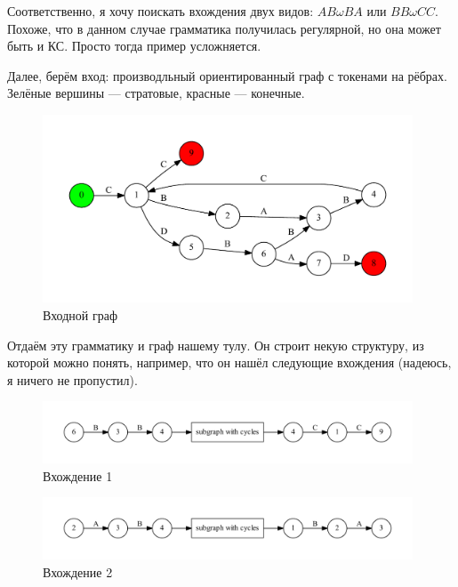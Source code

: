 \documentclass[a5paper]{article}
\begin{document}
Соответственно, я хочу поискать вхождения двух видов:  $AB\omega BA$ или $BB\omega CC$. Похоже, что в данном случае грамматика получилась регулярной, но она может быть и КС. Просто тогда пример усложняется.


Далее, берём вход: производльный ориентированный граф с токенами на рёбрах. Зелёные вершины --- стратовые, красные --- конечные.

\begin{figure}[H]
    \begin{center}
        \includegraphics[width=11cm]{input.pdf}
        \caption{Входной граф}
        \label{pic1}        
    \end{center}
\end{figure}

Отдаём эту грамматику и граф нашему тулу. Он строит некую структуру, из которой можно понять, например, что он нашёл следующие вхождения (надеюсь, я ничего не пропустил).

\begin{figure}
    \begin{center}
        \includegraphics[width=11cm]{out1.pdf}
        \caption{Вхождение 1}
        \label{pic1}        
    \end{center}
\end{figure}

\begin{figure}
    \begin{center}
        \includegraphics[width=11cm]{out2.pdf}
        \caption{Вхождение 2}
        \label{pic1}        
    \end{center}
\end{figure}
\end{document}
